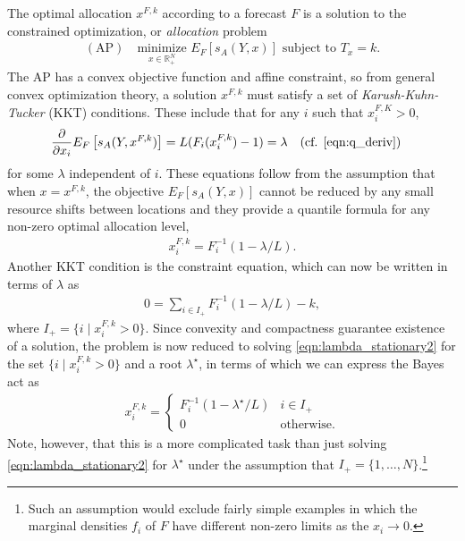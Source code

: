 \documentclass{article}
\begin{document}
The optimal allocation $x^{F,k}$ according to a forecast $F$ is a solution to the constrained optimization, or \emph{allocation} problem
\begin{align}
    (\mathrm{AP}) \quad \underset{x \in \mathbb{R}_{+}^N}{\mathrm{minimize}}\,\, E_{F}\left[s_A(Y,x)\right] \text{ subject to } 
    T_x = k. \label{AP}
\end{align}
The AP has a convex objective function and affine constraint, so from general convex optimization theory, a solution $x^{F,k}$ must satisfy a set of \emph{Karush-Kuhn-Tucker} (KKT) conditions. These include that for any $i$ such that $x_i^{F,K} > 0$,
\begin{align}
\frac{\partial}{\partial x_i} E_{F}\left[s_A(Y,x^{F,k})\right] &= L(F_i(x_i^{F,k})-1) = \lambda
\quad (\text{cf. \eqref{eqn:q_deriv}}) \label{eqn:x_stationary}
\end{align}
for some $\lambda$ independent of $i$. These equations follow from the assumption that when $x=x^{F,k}$, the objective $E_{F}\left[s_A(Y,x)\right]$ cannot be reduced by any small
resource shifts between locations and they provide a quantile formula for any non-zero optimal allocation level,
\begin{align}
x_i^{F,k} = F_i^{-1}(1-\lambda/L). \label{eqn:xfk_formula}
\end{align}
Another KKT condition is the constraint equation, which can now be written in terms of $\lambda$ as
\begin{align}
0 = \sum_{i \in I_+} F_{i}^{-1}(1-\lambda/L) - k, \label{eqn:lambda_stationary2}
\end{align}
where $I_+ = \{i \mid x_i^{F,k} > 0\}$.
Since convexity and compactness guarantee existence of a solution, the problem is now reduced to solving 
\eqref{eqn:lambda_stationary2} for the set 
$\{i \mid x_i^{F,k} > 0\}$ and a root $\lambda^{\star}$, in terms of which we can express the Bayes act as
\begin{align}
x_i^{F,k} = 
\begin{cases}
F_i^{-1}(1-\lambda^{\star}/L) &  i \in I_+ \\
0 & \text{otherwise}.
\end{cases}
\end{align}
Note, however, that this is a more complicated task than just solving \eqref{eqn:lambda_stationary2}
for $\lambda^{\star}$ under the assumption that $I_+ = \{1,\ldots,N\}$.\footnote{Such an assumption would exclude fairly simple examples in which the marginal densities $f_i$ of $F$ have different non-zero limits as the $x_i \to 0$.} 
\end{document}
